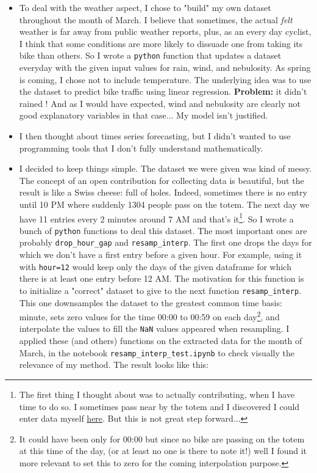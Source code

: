 \documentclass[11pt,a4paper]{article}
\begin{document}
\begin{itemize}
\item To deal with the weather aspect, I chose to "build" my own dataset throughout the month of March. I believe that sometimes, the actual \textit{felt} weather is far away from public weather reports, plus, as an every day cyclist, I think that some conditions are more likely to dissuade one from taking its bike than others. So I wrote a \texttt{python} function that updates a dataset everyday with the given input values for rain, wind, and nebulosity. As spring is coming, I chose not to include temperature. The underlying idea was to use the dataset to predict bike traffic using linear regression. \textbf{Problem:} it didn't rained ! And as I would have expected, wind and nebulosity are clearly not good explanatory variables in that case... My model isn't justified.
\item I then thought about times series forecasting, but I didn't wanted to use programming tools that I don't fully understand mathematically.
\item I decided to keep things simple. The dataset we were given was kind of messy. The concept of an open contribution for collecting data is beautiful, but the result is like a Swiss cheese: full of holes. Indeed, sometimes there is no entry until 10 PM where suddenly 1304 people pass on the totem. The next day we have 11 entries every 2 minutes around 7 AM and that's it\footnote{The first thing I thought about was to actually contributing, when I have time to do so. I sometimes pass near by the totem and I discovered I could enter data myself \href{https://docs.google.com/forms/d/e/1FAIpQLSfPHrWpHSj0A0VHzkaBlvSYCgUBQQyQOPOJ6lhq0dIDLvcDlg/viewform}{here}. But this is not great step forward...}.
So I wrote a bunch of \texttt{python} functions to deal this dataset. The most important ones are probably \texttt{drop\_hour\_gap} and \texttt{resamp\_interp}. The first one drops the days for which we don't have a first entry before a given hour. For example, using it with \texttt{hour=12} would keep only the days of the given dataframe for which there is at least one entry before 12 AM. The motivation for this function is to initialize a "correct" dataset to give to the next function \texttt{resamp\_interp}. This one downsamples the dataset to the greatest common time basis: minute, sets zero values for the time 00:00 to 00:59 on each day\footnote{It could have been only for 00:00 but since no bike are passing on the totem at this time of the day, (or at least no one is there to note it!) well I found it more relevant to set this to zero for the coming interpolation purpose.}, and interpolate the values to fill the \texttt{NaN} values appeared when resampling. I applied these (and others) functions on the extracted data for the month of March, in the notebook \texttt{resamp\_interp\_test.ipynb} to check visually the relevance of my method. The result looks like this:\\


\end{itemize}
\end{document}
